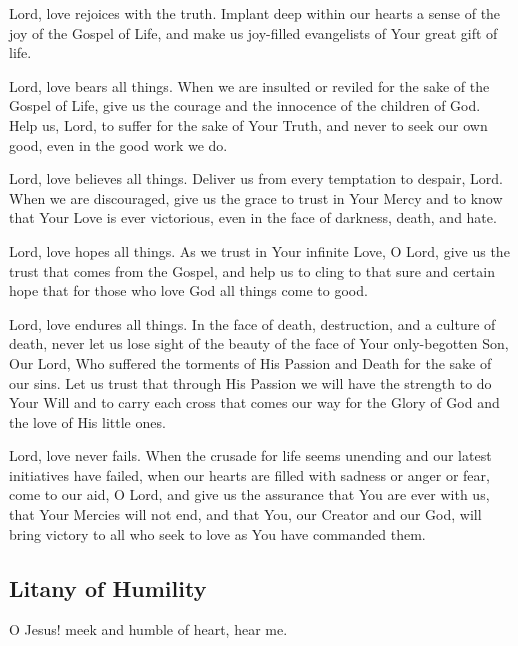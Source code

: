 \documentclass[12pt]{article}
\newcommand{\prayertitle}[1]{\subsection{#1}}
\begin{document}
Lord, love rejoices with the truth.
Implant deep within our hearts a sense of the joy of the Gospel of Life, and make us joy-filled evangelists of Your great gift of life.

Lord, love bears all things.
When we are insulted or reviled for the sake of the Gospel of Life, give us the courage and the innocence of the children of God.
Help us, Lord, to suffer for the sake of Your Truth, and never to seek our own good, even in the good work we do.

Lord, love believes all things.
Deliver us from every temptation to despair, Lord. When we are discouraged, give us the grace to trust in Your Mercy and to know that Your Love is ever victorious, even in the face of darkness, death, and hate.

Lord, love hopes all things.
As we trust in Your infinite Love, O Lord, give us the trust that comes from the Gospel, and help us to cling to that sure and certain hope that for those who love God all things come to good.

Lord, love endures all things.
In the face of death, destruction, and a culture of death, never let us lose sight of the beauty of the face of Your only-begotten Son, Our Lord, Who suffered the torments of His Passion and Death for the sake of our sins.
Let us trust that through His Passion we will have the strength to do Your Will and to carry each cross that comes our way for the Glory of God and the love of His little ones.

Lord, love never fails.
When the crusade for life seems unending and our latest initiatives have failed, when our hearts are filled with sadness or anger or fear, come to our aid, O Lord, and give us the assurance that You are ever with us, that Your Mercies will not end, and that You, our Creator and our God, will bring victory to all who seek to love as You have commanded them.

\prayertitle{Litany of Humility}
\label{prayer:litany_of_humility}
O Jesus! meek and humble of heart, hear me.
\end{document}

